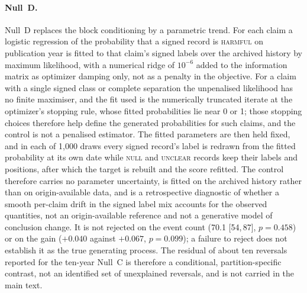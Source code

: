 \documentclass[11pt]{article}
\newcommand{\ci}[2]{[#1,\,#2]}
\begin{document}
\paragraph{Null~D.} Null~D replaces the block conditioning by a parametric trend. For each claim a
logistic regression of the probability that a signed record is \textsc{harmful} on publication year
is fitted to that claim's signed labels over the archived history by maximum likelihood, with a
numerical ridge of $10^{-6}$ added to the information matrix as optimizer damping only, not as a
penalty in the objective. For a claim with a single signed class or complete separation the
unpenalised likelihood has no finite maximiser, and the fit used is the numerically truncated
iterate at the optimizer's stopping rule, whose fitted probabilities lie near 0 or 1; those
stopping choices therefore help define the generated probabilities for such claims, and the
control is not a penalised estimator. The fitted parameters are then held fixed, and in each of 1{,}000 draws every signed record's label is
redrawn from the fitted probability at its own date while \textsc{null} and \textsc{unclear}
records keep their labels and positions, after which the target is rebuilt and the score refitted.
The control therefore carries no parameter uncertainty, is fitted on the archived history rather
than on origin-available data, and is a retrospective diagnostic of whether a smooth per-claim
drift in the signed label mix accounts for the observed quantities, not an origin-available
reference and not a generative model of conclusion change. It is not rejected on the event count
(70.1 \ci{54}{87}, $p=0.458$) or on the gain ($+0.040$ against $+0.067$, $p=0.099$); a failure to
reject does not establish it as the true generating process. The residual of about ten reversals
reported for the ten-year Null~C is therefore a conditional, partition-specific contrast, not an
identified set of unexplained reversals, and is not carried in the main text.
\end{document}
